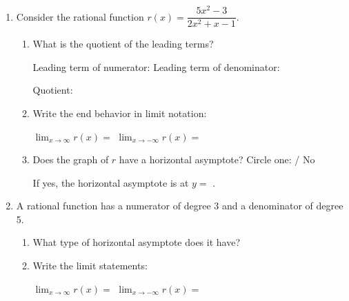 \documentclass[10pt]{article}
\begin{document}
\namedateperiod

\vspace{0.16in}

\begin{enumerate}[itemsep=18pt]

\item Consider the rational function $r(x) = \dfrac{5x^2 - 3}{2x^2 + x - 1}$.

\begin{enumerate}[label=(\alph*), itemsep=10pt]
  \item What is the quotient of the leading terms?

        \medskip
        Leading term of numerator:  \quad
        Leading term of denominator: 

        \medskip
        Quotient: 

  \item Write the end behavior in limit notation:

        \medskip
        $\displaystyle\lim_{x \to \infty} r(x) = $ 
        \qquad
        $\displaystyle\lim_{x \to -\infty} r(x) = $ 

  \item Does the graph of $r$ have a horizontal asymptote?
        Circle one: \quad {} \quad / \quad No

        \medskip
        If yes, the horizontal asymptote is at $y = $ .
\end{enumerate}

\item A rational function has a numerator of degree 3 and a denominator of degree 5.

\begin{enumerate}[label=(\alph*), itemsep=8pt]
  \item What type of horizontal asymptote does it have?
  \item Write the limit statements:

        \medskip
        $\displaystyle\lim_{x \to \infty} r(x) = $ 
        \qquad
        $\displaystyle\lim_{x \to -\infty} r(x) = $ 
\end{enumerate}

\end{enumerate}
\end{document}
